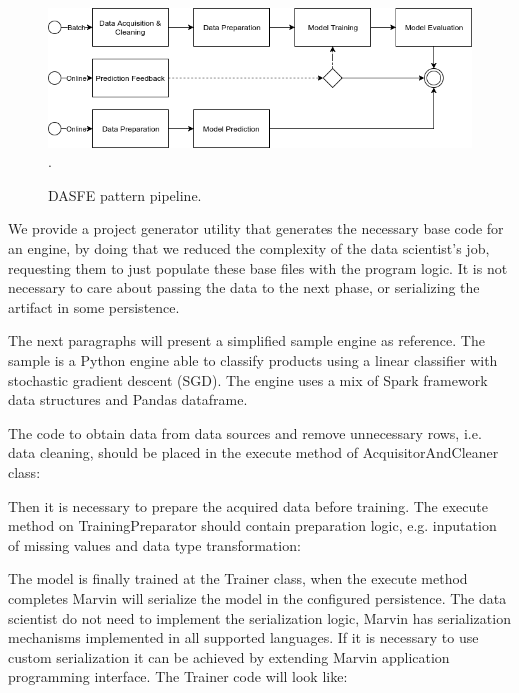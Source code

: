 \documentclass[twoside,11pt]{article}
\begin{document}
\begin{figure}[h]
\centering
\includegraphics[scale=0.6]{fig/marvin-dase.png}
\DeclareGraphicsExtensions.
\caption{DASFE pattern pipeline.}
\label{fig_dase}
\end{figure}

We provide a project generator utility that generates the necessary base code for an engine, by doing that we reduced the complexity of the data scientist's job, requesting them to just populate these base files with the program logic. It is not necessary to care about passing the data to the next phase, or serializing the artifact in some persistence.

The next paragraphs will present a simplified sample engine as reference. The sample is a Python engine able to classify products using a linear classifier with stochastic gradient descent (SGD). The engine uses a mix of Spark framework data structures and Pandas dataframe.

The code to obtain data from data sources and remove unnecessary rows, i.e. data cleaning, should be placed in the execute method of AcquisitorAndCleaner class:


Then it is necessary to prepare the acquired data before training. The execute method on TrainingPreparator should contain preparation logic, e.g. inputation of missing values and data type transformation:



The model is finally trained at the Trainer class, when the execute method completes Marvin will serialize the model in the configured persistence. The data scientist do not need to implement the serialization logic, Marvin has serialization mechanisms implemented in all supported languages. If it is necessary to use custom serialization it can be achieved by extending Marvin application programming interface. The Trainer code will look like:


\end{document}
